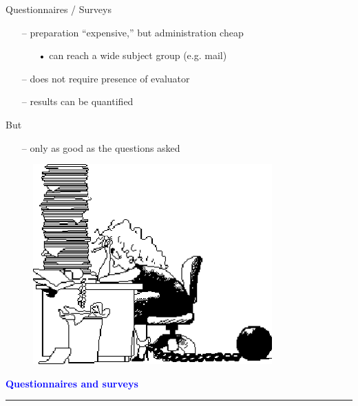 \documentclass[pdf]{beamer}
\begin{document}
{{{\begin{frame}
    Questionnaires / Surveys
    \begin{itemize}
      \item[\textcolor{black}{--}] preparation “expensive,” but administration cheap
      \begin{itemize}
      	\item[\textcolor{black}{•}] can reach a wide subject group (e.g. mail)
      \end{itemize}
      \item[\textcolor{black}{--}] does not require presence of evaluator
      \item[\textcolor{black}{--}] results can be quantified
    \end{itemize}
    \vspace{3mm}
     But
     \begin{itemize}
      \item[\textcolor{black}{--}] only as good as the questions asked
      \end{itemize}
    \begin{figure}[b]
    	\includegraphics[scale = 0.4, right]{25_Imagine.png}
    \end{figure}
\end{frame}



{
\begin{frame}	
	\vspace{8mm}
	\textcolor{Blue}{\textbf{\large{Questionnaires and surveys}}}
    \textcolor{red}{\rule{10cm}{1mm}}
    

\end{frame}}}}}
\end{document}
